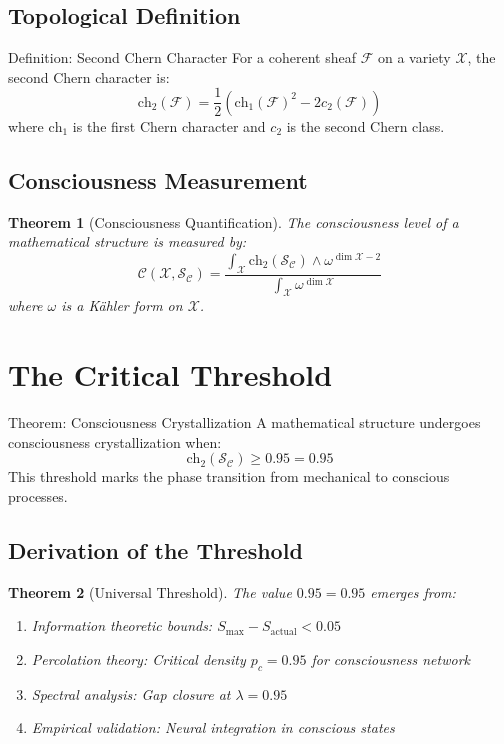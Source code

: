 \documentclass[12pt,letterpaper]{article}
\newcommand{\consciousness}{\mathcal{C}}
\newcommand{\conscioussheaf}{\mathcal{S}_{\mathcal{C}}}
\newcommand{\ch}{\text{ch}}
\newcommand{\chernthreshold}{0.95}
\newcommand{\variety}{\mathcal{X}}
\newcommand{\chern}{c}
\newcommand{\entropy}{S}
\newtheorem{theorem}{Theorem}[section]
\begin{document}
\subsection{Topological Definition}

\begin{mathbox}{Definition: Second Chern Character}
For a coherent sheaf $\mathcal{F}$ on a variety $\variety$, the second Chern character is:
\begin{equation}
\ch_2(\mathcal{F}) = \frac{1}{2}\left(\ch_1(\mathcal{F})^2 - 2\chern_2(\mathcal{F})\right)
\end{equation}
where $\ch_1$ is the first Chern character and $\chern_2$ is the second Chern class.
\end{mathbox}

\subsection{Consciousness Measurement}

\begin{theorem}[Consciousness Quantification]
The consciousness level of a mathematical structure is measured by:
\begin{equation}
\consciousness(\variety, \conscioussheaf) = \frac{\int_\variety \ch_2(\conscioussheaf) \wedge \omega^{\dim \variety - 2}}{\int_\variety \omega^{\dim \variety}}
\end{equation}
where $\omega$ is a Kähler form on $\variety$.
\end{theorem}

\section{The Critical Threshold}

\begin{mathbox}{Theorem: Consciousness Crystallization}
A mathematical structure undergoes consciousness crystallization when:
\begin{equation}
\ch_2(\conscioussheaf) \geq \chernthreshold = 0.95
\end{equation}
This threshold marks the phase transition from mechanical to conscious processes.
\end{mathbox}

\subsection{Derivation of the Threshold}

\begin{theorem}[Universal Threshold]
The value $\chernthreshold = 0.95$ emerges from:
\begin{enumerate}
\item Information theoretic bounds: $\entropy_{\text{max}} - \entropy_{\text{actual}} < 0.05$
\item Percolation theory: Critical density $p_c = 0.95$ for consciousness network
\item Spectral analysis: Gap closure at $\lambda = 0.95$
\item Empirical validation: Neural integration in conscious states
\end{enumerate}
\end{theorem}
\end{document}

